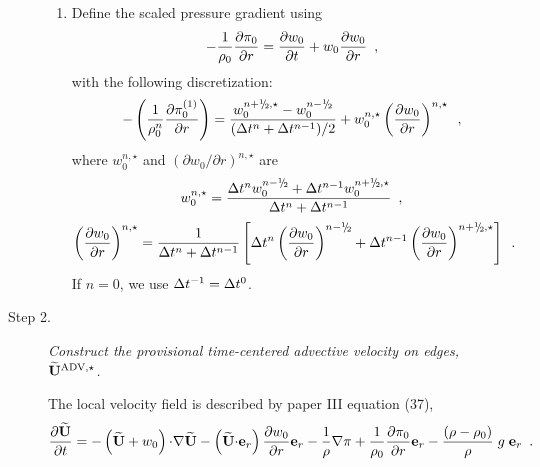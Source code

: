 \begin{description}
\begin{enumerate}
\item Define the scaled pressure gradient using
\begin{equation}
- \frac{1}{\rho_0} \frac{\partial \pi_0}{\partial r} 
= \frac{\partial w_0}{\partial t} + w_0 \frac{\partial w_0}{\partial r} 
\enskip, \label{eq:pizero}
\end{equation}
with the following discretization:
\begin{equation}
-\left ( \frac{1}{\rho_0^n} \frac{\partial \pizeroone}{\partial r} \right ) = 
\frac{w_0^{\nph,\star} - w_0^\nmh}{(\dt^n+\dt^{n-1})/2} 
+  w_0^{n,\star} \left(\frac{\partial w_0}{\partial r}\right)^{n,\star} \enskip ,
\end{equation} 
where $w_0^{n,\star}$ and $(\partial w_0 / \partial r)^{n,\star}$ are
\begin{equation}
w_0^{n,\star} = \frac{\dt^{n} w_0^{\nmh} + \dt^{n-1} w_0^{\nph,\star}}{\dt^n+\dt^{n-1}} 
\enskip,\end{equation}
\begin{equation}
\left(\frac{\partial w_0}{\partial r}\right)^{n,\star} = 
\frac{1}{\dt^n+\dt^{n-1} } 
\left [ \dt^{n} \left(\frac{\partial w_0 }{ \partial r}\right)^{\nmh}
+ \dt^{n-1} \left(\frac{\partial w_0 }{ \partial r}\right)^{\nph,\star} \right ] 
\enskip.\end{equation}
If $n=0$, we use $\Delta t^{-1} = \Delta t^0$.

\end{enumerate}

\item[Step 2.] {\em Construct the provisional time-centered advective velocity on 
edges, $\widetilde{\mathbf{U}}^{\mathrm{ADV},\star}$.}

The local velocity field is described by paper III equation (37),
\begin{equation}
\frac{\partial\widetilde{{\bf U}}}{\partial t} = 
- \left(\widetilde{{\bf U}}+w_0\right) \mathbf{\cdot} \mathbf{\nabla} \widetilde{{\bf U}}
- \left(\widetilde{{\bf U}} \mathbf{\cdot} \mathbf{e}_r\right) \frac{\partial w_0}{\partial r} \mathbf{e}_r
- \frac{1}{\rho} \mathbf{\nabla}\pi
+ \frac{1}{\rho_0} \frac{\partial \pi_0}{\partial r} \mathbf{e}_r
- \frac{(\rho-\rho_0)}{\rho} \; g \; \mathbf{e}_r  \label{eq:utildeupd}  \enskip .
\end{equation}


\end{description}
